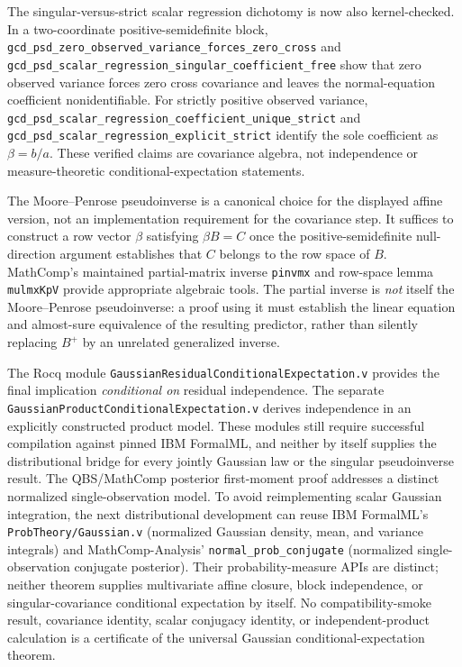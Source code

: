 The singular-versus-strict scalar regression dichotomy is now also
kernel-checked. In a two-coordinate positive-semidefinite block,
\nolinkurl{gcd_psd_zero_observed_variance_forces_zero_cross}
and
\nolinkurl{gcd_psd_scalar_regression_singular_coefficient_free}
show that zero observed variance forces zero cross covariance and
leaves the normal-equation coefficient nonidentifiable. For strictly
positive observed variance,
\nolinkurl{gcd_psd_scalar_regression_coefficient_unique_strict}
and \nolinkurl{gcd_psd_scalar_regression_explicit_strict}
identify the sole coefficient as \(\beta=b/a\).
These verified claims are covariance algebra, not independence or
measure-theoretic conditional-expectation statements.

The Moore--Penrose pseudoinverse is a canonical choice for the
displayed affine version, not an implementation requirement for the
covariance step. It suffices to construct a row vector
\(\beta\) satisfying \(\beta B=C\) once the positive-semidefinite
null-direction argument establishes that \(C\) belongs to the row
space of \(B\). MathComp's maintained partial-matrix inverse
\nolinkurl{pinvmx} and row-space lemma \nolinkurl{mulmxKpV} provide
appropriate algebraic tools. The partial inverse is
\emph{not} itself the Moore--Penrose pseudoinverse: a proof using
it must establish the linear equation and almost-sure equivalence
of the resulting predictor, rather than silently replacing
\(B^+\) by an unrelated generalized inverse.

The Rocq module \nolinkurl{GaussianResidualConditionalExpectation.v}
provides the final implication \emph{conditional on} residual
independence. The separate
\nolinkurl{GaussianProductConditionalExpectation.v} derives independence
in an explicitly constructed product model. These modules still
require successful compilation against pinned IBM FormalML, and neither
by itself supplies the distributional bridge for every jointly
Gaussian law or the singular pseudoinverse result. The QBS/MathComp
posterior first-moment proof addresses a distinct normalized
single-observation model. To avoid reimplementing scalar Gaussian
integration, the next distributional development can reuse IBM
FormalML's \nolinkurl{ProbTheory/Gaussian.v} (normalized Gaussian density,
mean, and variance integrals) and MathComp-Analysis'
\nolinkurl{normal_prob_conjugate} (normalized single-observation
conjugate posterior). Their probability-measure APIs are distinct;
neither theorem supplies multivariate affine closure, block
independence, or singular-covariance conditional expectation by itself.
No compatibility-smoke result, covariance identity, scalar conjugacy
identity, or independent-product calculation is a certificate of the
universal Gaussian conditional-expectation theorem.

